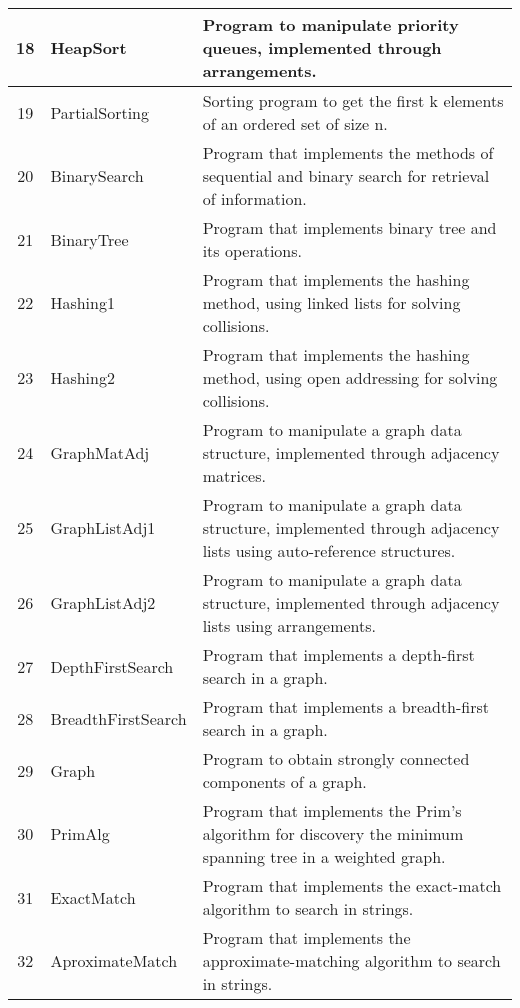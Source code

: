 \begin{table*}[!ht]
\begin{tabular}{|c|l|l|}
18& HeapSort& Program to manipulate priority queues, implemented through arrangements.\\\hline
19& PartialSorting& Sorting program to get the first k elements of an ordered set of size n.\\\hline
20& BinarySearch& Program that implements the methods of sequential and binary search for retrieval of information.\\\hline
21& BinaryTree& Program that implements binary tree and its operations.\\\hline
22& Hashing1& Program that implements the hashing method, using linked lists for solving collisions.\\\hline
23& Hashing2& Program that implements the hashing method, using open addressing for solving collisions.\\\hline
24& GraphMatAdj& Program to manipulate a graph data structure, implemented through adjacency matrices.\\\hline
25& GraphListAdj1& Program to manipulate a graph data structure, implemented through adjacency lists using auto-reference structures.\\\hline
26& GraphListAdj2& Program to manipulate a graph data structure, implemented through adjacency lists using arrangements.\\\hline
27& DepthFirstSearch& Program that implements a depth-first search in a graph.\\\hline
28& BreadthFirstSearch& Program that implements a breadth-first search in a graph.\\\hline
29& Graph& Program to obtain strongly connected components of a graph.\\\hline
30& PrimAlg& Program that implements the Prim’s algorithm for discovery the minimum spanning tree in a weighted graph.\\\hline
31& ExactMatch& Program that implements the exact-match algorithm to search in strings.\\\hline
32& AproximateMatch& Program that implements the approximate-matching algorithm to search in strings.\\\hline
    \end{tabular}
\end{table*}